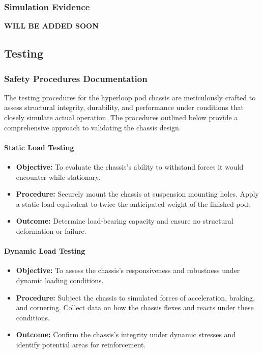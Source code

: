 \subsubsection{Simulation Evidence}

\textbf{WILL BE ADDED SOON}




\subsection{Testing}


\subsubsection{Safety Procedures Documentation}

The testing procedures for the hyperloop pod chassis are meticulously crafted to assess structural integrity, durability, and performance under conditions that closely simulate actual operation. The procedures outlined below provide a comprehensive approach to validating the chassis design.

\paragraph{Static Load Testing}
\begin{itemize}
    \item \textbf{Objective:} To evaluate the chassis's ability to withstand forces it would encounter while stationary.
    \item \textbf{Procedure:} Securely mount the chassis at suspension mounting holes. Apply a static load equivalent to twice the anticipated weight of the finished pod.
    \item \textbf{Outcome:} Determine load-bearing capacity and ensure no structural deformation or failure.
\end{itemize}

\paragraph{Dynamic Load Testing}
\begin{itemize}
    \item \textbf{Objective:} To assess the chassis's responsiveness and robustness under dynamic loading conditions.
    \item \textbf{Procedure:} Subject the chassis to simulated forces of acceleration, braking, and cornering. Collect data on how the chassis flexes and reacts under these conditions.
    \item \textbf{Outcome:} Confirm the chassis's integrity under dynamic stresses and identify potential areas for reinforcement.
\end{itemize}

